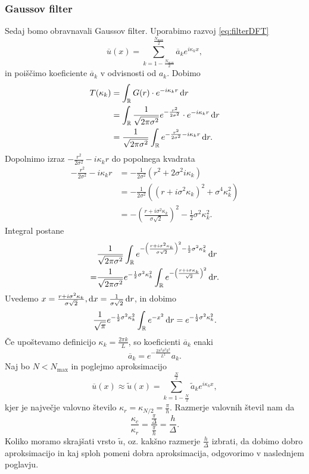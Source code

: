 \documentclass[mat2, tisk]{fmfdelo}
\newcommand{\R}{\mathbb R}
\begin{document}
\subsubsection{Gaussov filter}

Sedaj bomo obravnavali Gaussov filter. Uporabimo razvoj \eqref{eq:filterDFT}
$$
\overline{u}(x) = \sum_{k=1 - \frac{N_{\text{max}}}{2}}^\frac{N_{\text{max}}}{2} \overline{a}_k e^{i\kappa_k x},
$$
in poiščimo koeficiente $\overline{a}_k$ v odvisnosti od $a_k$. Dobimo
\begin{align*}
T(\kappa_k) &= \int_\R G(r) \cdot e^{-i\kappa_k r} \dif r \\
            &=\int_\R \frac{1}{\sqrt{2\pi \sigma^2}} e^{-\frac{r^2}{2\sigma^2}} \cdot e^{-i\kappa_k r} \dif r \\
            &= \frac{1}{\sqrt{2\pi \sigma^2}} \int_\R e^{-\frac{r^2}{2\sigma^2} - i\kappa_k r} \dif r.
\end{align*}
Dopolnimo izraz $-\frac{r^2}{2\sigma^2} - i\kappa_k r$ do popolnega kvadrata
\begin{align*}
-\frac{r^2}{2\sigma^2} - i\kappa_k r &= - \frac{1}{2\sigma^2}(r^2 + 2\sigma^2 i \kappa_k) \\
&=-\frac{1}{2\sigma^2} ((r + i\sigma^2 \kappa_k)^2  + \sigma^4 \kappa_k^2) \\
&=- \left(\frac{r + i\sigma^2 \kappa_k}{\sigma\sqrt{2}}\right)^2 - \frac{1}{2} \sigma^2 \kappa_k^2.
\end{align*}
Integral postane 
\begin{align*}
  & \frac{1}{\sqrt{2\pi \sigma^2}} \int_\R e^{-\left(\frac{r + i\sigma^2 \kappa_k}{\sigma\sqrt{2}}\right)^2 - \frac{1}{2} \sigma^2 \kappa_k^2} \dif r \\
  =& \frac{1}{\sqrt{2\pi \sigma^2}} e^{ - \frac{1}{2} \sigma^2 \kappa_k^2} \int_\R e^{-\left(\frac{r + i\sigma \kappa_k}{\sqrt{2}}\right)^2} \dif r.
\end{align*}  
Uvedemo $x = \frac{r + i\sigma^2 \kappa_k}{\sigma\sqrt{2}}, \dif x = \frac{1}{\sigma\sqrt{2}} \dif r$, in dobimo
\begin{align*}
\frac{1}{\sqrt{\pi}} e^{- \frac{1}{2} \sigma^2 \kappa_k^2} \int_\R e^{-x^2} \dif r = e^{- \frac{1}{2} \sigma^2 \kappa_k^2}.
\end{align*}
Če upoštevamo definicijo $\kappa_k = \frac{2\pi k}{L}$, so koeficienti $\overline{a}_k$ enaki
\begin{equation*}
  \overline{a}_k = e^{-\frac{2\pi^2 \sigma^2 k^2}{L^2}} a_k.
\end{equation*}
Naj bo $N < N_\text{max}$ in poglejmo aproksimacijo
\begin{equation*}
\overline{u}(x) \approx \tilde{u}(x) = \sum_{k=1 - \frac{N}{2}}^\frac{N}{2} \tilde{a}_k e^{i\kappa_k x},
\end{equation*}
kjer je največje valovno število $\kappa_r = \kappa_{N/2} = \frac{\pi}{h}$. Razmerje valovnih števil
nam da 
$$
\frac{\kappa_c}{\kappa_r} = \frac{\frac{\pi}{\Delta}}{\frac{\pi}{h}} = \frac{h}{\Delta}.
$$
Koliko moramo skrajšati vrsto $\tilde{u}$, oz. kakšno razmerje $\frac{h}{\Delta}$ izbrati, da 
dobimo dobro aproksimacijo in kaj sploh pomeni dobra aproksimacija,
odgovorimo v naslednjem poglavju. 
\end{document}
